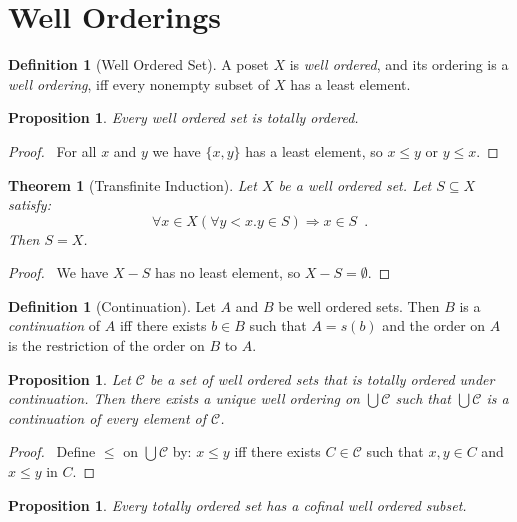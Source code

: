 \documentclass{report}
\let\qed\relax
\newtheorem{prop}[ax]{Proposition}
\newtheorem{thm}[ax]{Theorem}
\theoremstyle{definition}
\newtheorem{df}[ax]{Definition}
\begin{document}
\section{Well Orderings}

\begin{df}[Well Ordered Set]
A poset $X$ is \emph{well ordered}, and its ordering is a \emph{well ordering}, iff every nonempty subset of $X$ has a least element.
\end{df}

\begin{prop}
Every well ordered set is totally ordered.
\end{prop}

\begin{proof}
\pf\ For all $x$ and $y$ we have $\{x,y\}$ has a least element, so $x \leq y$ or $y \leq x$. \qed
\end{proof}

\begin{thm}[Transfinite Induction]
Let $X$ be a well ordered set. Let $S \subseteq X$ satisfy:
\[ \forall x \in X (\forall y < x. y \in S) \Rightarrow x \in S \enspace . \]
Then $S = X$.
\end{thm}

\begin{proof}
\pf\ We have $X - S$ has no least element, so $X - S = \emptyset$. \qed
\end{proof}

\begin{df}[Continuation]
Let $A$ and $B$ be well ordered sets. Then $B$ is a \emph{continuation} of $A$ iff there exists $b \in B$ such that $A = s(b)$ and the order on $A$ is the restriction of the order on $B$ to $A$.
\end{df}

\begin{prop}
\label{prop:union_under_continuation}
Let $\mathcal{C}$ be a set of well ordered sets that is totally ordered under continuation. Then there exists a unique well ordering on $\bigcup \mathcal{C}$ such that $\bigcup \mathcal{C}$ is a continuation of every element of $\mathcal{C}$.
\end{prop}

\begin{proof}
\pf\ Define $\leq$ on $\bigcup \mathcal{C}$ by: $x \leq y$ iff there exists $C \in \mathcal{C}$ such that $x, y \in C$ and $x \leq y$ in $C$. \qed
\end{proof}

\begin{prop}
Every totally ordered set has a cofinal well ordered subset.
\end{prop}
\end{document}
